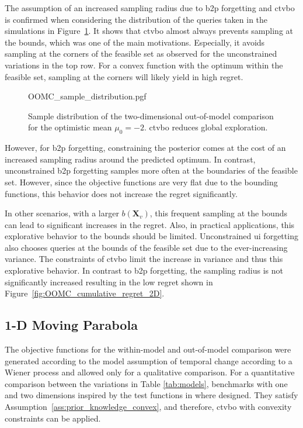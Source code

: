 The assumption of an increased sampling radius due to \gls{b2p} forgetting and \gls{ctvbo} is confirmed when considering the distribution of the queries taken in the simulations in Figure~\ref{fig:OOMC_sample_dsitribution}. It shows that \gls{ctvbo} almost always prevents sampling at the bounds, which was one of the main motivations. Especially, it avoids sampling at the corners of the feasible set as observed for the unconstrained variations in the top row. For a convex function with the optimum within the feasible set, sampling at the corners will likely yield in high regret.
\begin{figure}[h]
    \centering
    {OOMC\string_sample\string_distribution.pgf}
    \caption[Sample distribution of the two-dimensional out-of-model comparison.]{Sample distribution of the two-dimensional out-of-model comparison for the optimistic mean $\mu_0=-2$. \gls{ctvbo} reduces global exploration.}
    \label{fig:OOMC_sample_dsitribution}
\end{figure}

However, for \gls{b2p} forgetting, constraining the posterior comes at the cost of an increased sampling radius around the predicted optimum. In contrast, unconstrained \gls{b2p} forgetting samples more often at the boundaries of the feasible set. However, since the objective functions are very flat due to the bounding functions, this behavior does not increase the regret significantly. 

In other scenarios, with a larger $b(\mathbf{X}_v)$, this frequent sampling at the bounds can lead to significant increases in the regret. Also, in practical applications, this explorative behavior to the bounds should be limited. Unconstrained \gls{ui} forgetting also chooses queries at the bounds of the feasible set due to the ever-increasing variance. The constraints of \gls{ctvbo} limit the increase in variance and thus this explorative behavior. In contrast to \gls{b2p} forgetting, the sampling radius is not significantly increased resulting in the low regret shown in Figure~\ref{fig:OOMC_cumulative_regret_2D}.

\subsection{1-D Moving Parabola}
\label{sec:1D}

The objective functions for the within-model and out-of-model comparison were generated according to the model assumption of temporal change according to a Wiener process and allowed only for a qualitative comparison. For a quantitative comparison between the variations in Table \ref{tab:models}, benchmarks with one and two dimensions inspired by the test functions in \textcite{Renganathan_2020} where designed. They satisfy Assumption~\ref{ass:prior_knowledge_convex}, and therefore, \gls{ctvbo} with convexity constraints can be applied.

